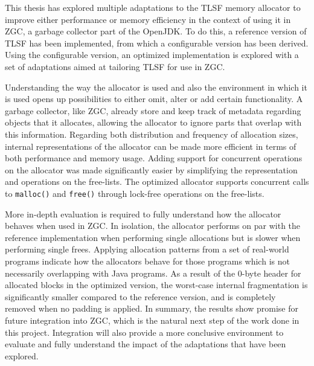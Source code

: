 
This thesis has explored multiple adaptations to the TLSF memory allocator to improve either performance or memory efficiency in the context of using it in ZGC, a garbage collector part of the OpenJDK. To do this, a reference version of TLSF has been implemented, from which a configurable version has been derived. Using the configurable version, an optimized implementation is explored with a set of adaptations aimed at tailoring TLSF for use in ZGC.

Understanding the way the allocator is used and also the environment in which it is used opens up possibilities to either omit, alter or add certain functionality. A garbage collector, like ZGC, already store and keep track of metadata regarding objects that it allocates, allowing the allocator to ignore parts that overlap with this information. Regarding both distribution and frequency of allocation sizes, internal representations of the allocator can be made more efficient in terms of both performance and memory usage. Adding support for concurrent operations on the allocator was made significantly easier by simplifying the representation and operations on the free-lists. The optimized allocator supports concurrent calls to \texttt{malloc()} and \texttt{free()} through lock-free operations on the free-lists.

More in-depth evaluation is required to fully understand how the allocator behaves when used in ZGC. In isolation, the allocator performs on par with the reference implementation when performing single allocations but is slower when performing single frees. Applying allocation patterns from a set of real-world programs indicate how the allocators behave for those programs which is not necessarily overlapping with Java programs. As a result of the 0-byte header for allocated blocks in the optimized version, the worst-case internal fragmentation is significantly smaller compared to the reference version, and is completely removed when no padding is applied. In summary, the results show promise for future integration into ZGC, which is the natural next step of the work done in this project. Integration will also provide a more conclusive environment to evaluate and fully understand the impact of the adaptations that have been explored.

